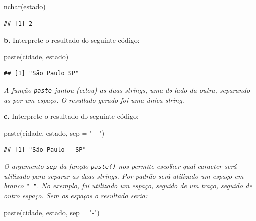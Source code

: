 \documentclass[
]{book}
\newenvironment{Shaded}{\begin{snugshade}}{\end{snugshade}}
\newcommand{\AttributeTok}[1]{\textcolor[rgb]{0.77,0.63,0.00}{#1}}
\newcommand{\FunctionTok}[1]{\textcolor[rgb]{0.00,0.00,0.00}{#1}}
\newcommand{\NormalTok}[1]{#1}
\newcommand{\StringTok}[1]{\textcolor[rgb]{0.31,0.60,0.02}{#1}}
\begin{document}
\begin{Shaded}
\begin{Highlighting}[]
\FunctionTok{nchar}\NormalTok{(estado)}
\end{Highlighting}
\end{Shaded}

\begin{verbatim}
## [1] 2
\end{verbatim}

\textbf{b.} Interprete o resultado do seguinte código:

\begin{Shaded}
\begin{Highlighting}[]
\FunctionTok{paste}\NormalTok{(cidade, estado)}
\end{Highlighting}
\end{Shaded}

\begin{verbatim}
## [1] "São Paulo SP"
\end{verbatim}

\emph{A função \texttt{paste} juntou (colou) as duas strings, uma do lado da outra, separando-as por um espaço. O resultado gerado foi uma única string.}

\textbf{c.} Interprete o resultado do seguinte código:

\begin{Shaded}
\begin{Highlighting}[]
\FunctionTok{paste}\NormalTok{(cidade, estado, }\AttributeTok{sep =} \StringTok{" {-} "}\NormalTok{)}
\end{Highlighting}
\end{Shaded}

\begin{verbatim}
## [1] "São Paulo - SP"
\end{verbatim}

\emph{O argumento \texttt{sep} da função \texttt{paste()} nos permite escolher qual caracter será utilizado para separar as duas strings. Por padrão será utilizado um espaço em branco \texttt{"\ "}. No exemplo, foi utilizado um espaço, seguido de um traço, seguido de outro espaço. Sem os espaços o resultado seria:}

\begin{Shaded}
\begin{Highlighting}[]
\FunctionTok{paste}\NormalTok{(cidade, estado, }\AttributeTok{sep =} \StringTok{"{-}"}\NormalTok{)}
\end{Highlighting}
\end{Shaded}
\end{document}
